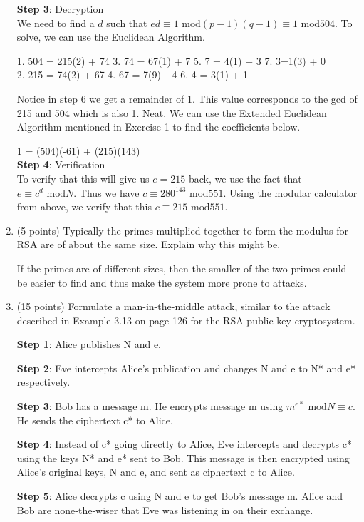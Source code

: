 \documentclass[12pt]{article}
\begin{document}
\begin{enumerate}
\textbf{Step 3}: Decryption \\
We need to find a $d$ such that $ed \equiv 1 \text{ mod}(p-1)(q-1) \equiv 1 \text{ mod}504$. To solve, we can use the Euclidean Algorithm. 

 1. 504 = 215(2) + 74\hspace{8mm} 3. 74  = 67(1)  + 7\hspace{8mm} 5. 7   = 4(1)   + 3\hspace{8mm} 7. 3=1(3)   + 0\\2. 215 = 74(2)  + 67     \hspace{9mm} 4. 67 = 7(9)+ 4\hspace{11mm} 6. 4   = 3(1)   + 1

Notice in step 6 we get a remainder of 1. This value corresponds to the gcd of 215 and 504 which is also 1. Neat. We can use the Extended Euclidean Algorithm mentioned in Exercise 1 to find the coefficients below.

1 = (504)(-61) + (215)(143)\\

\textbf{Step 4}: Verification\\
To verify that this will give us $e=215$ back, we use the fact that $e\equiv c^d \text{ mod}N$. Thus we have $c\equiv 280^{143}\text{ mod}551$. Using the modular calculator from above, we verify that this $c\equiv 215 \text{ mod} 551$.\\



\item (5 points)
Typically the primes multiplied together to form the modulus for RSA are of about the same size.  Explain why this might be.

If the primes are of different sizes, then the smaller of the two primes could be easier to find and thus make the system more prone to attacks.\\



\item (15 points)
Formulate a man-in-the-middle attack, similar to the attack described in Example 3.13 on page 126 for the RSA public key cryptosystem.

\textbf{Step 1}: Alice publishes N and e.

\textbf{Step 2}: Eve intercepts Alice's publication and changes N  and e to N* and e* respectively.

\textbf{Step 3}: Bob has a message m. He encrypts message m using $m^{e*}\text{ mod}N\equiv c$. He sends the ciphertext c* to Alice.

\textbf{Step 4}: Instead of c* going directly to Alice, Eve intercepts and decrypts c* using the keys N* and e* sent to Bob. This message is then encrypted using Alice's original keys, N and e, and sent as ciphertext c to Alice.

\textbf{Step 5}: Alice decrypts c using N and e to get Bob's message m. Alice and Bob are none-the-wiser that Eve was listening in on their exchange.

\end{enumerate}
\end{document}
